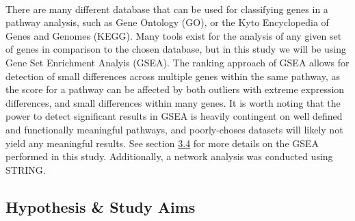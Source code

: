 \documentclass{article}
\begin{document}
\\There are many different database that can be used for classifying genes in a pathway analysis, such as Gene Ontology (GO)\cite{Ashburner2000GeneBiology}, or the Kyto Encyclopedia of Genes and Genomes (KEGG)\cite{Kanehisa2016KEGGAnnotation}. Many tools exist for the analysis of any given set of genes in comparison to the chosen database, but in this study we will be using Gene Set Enrichment Analyis (GSEA)\cite{Subramanian2005GeneProfiles}. The ranking approach of GSEA allows for detection of small differences across multiple genes within the same pathway, as the score for a pathway can be affected by both outliers with extreme expression differences, and small differences within many genes. It is worth noting that the power to detect significant results in GSEA is heavily contingent on well defined and functionally meaningful pathways, and poorly-choses datasets will likely not yield any meaningful results. See section \hyperref[subsec:pathways]{3.4} for more details on the GSEA performed in this study. Additionally, a network analysis was conducted using STRING\cite{Neumeyer2020StrengtheningLoci}.
\subsection{Hypothesis \& Study Aims}
\end{document}
